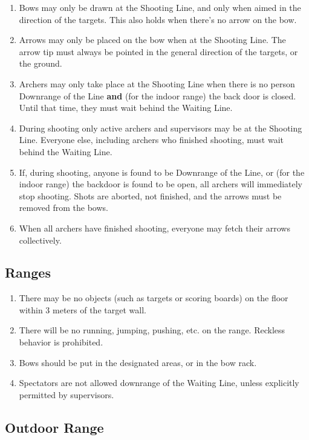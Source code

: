 \documentclass[a4paper]{article}
\begin{document}
\begin{enumerate}
  \item Bows may only be drawn at the Shooting Line, and only when aimed in the direction of the targets. This also holds when there's no arrow on the bow.
  \item Arrows may only be placed on the bow when at the Shooting Line. The arrow tip must always be pointed in the general direction of the targets, or the ground.
  \item Archers may only take place at the Shooting Line when there is no person Downrange of the Line {\bf and} (for the indoor range) the back door is closed. Until that time, they must wait behind the Waiting Line.
  \item During shooting only active archers and supervisors may be at the Shooting Line. Everyone else, including archers who finished shooting, must wait behind the Waiting Line.
  \item If, during shooting, anyone is found to be Downrange of the Line, or (for the indoor range) the backdoor is found to be open, all archers will immediately stop shooting. Shots are aborted, not finished, and the arrows must be removed from the bows.
  \item When all archers have finished shooting, everyone may fetch their arrows collectively.
\end{enumerate}

\subsection{Ranges}

\begin{enumerate}
  \item There may be no objects (such as targets or scoring boards) on the floor within 3 meters of the target wall.
  \item There will be no running, jumping, pushing, etc. on the range. Reckless behavior is prohibited.
  \item Bows should be put in the designated areas, or in the bow rack.
  \item Spectators are not allowed downrange of the Waiting Line, unless explicitly permitted by supervisors.
\end{enumerate}

\subsection{Outdoor Range}
\label{rules:outdoor}
\end{document}
